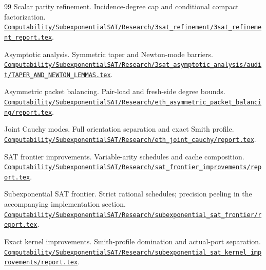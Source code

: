 \begin{thebibliography}{99}
 Scalar parity refinement. Incidence-degree cap and conditional compact factorization.
\href{https://github.com/VladimirReshetnikov/ProveIt/blob/dde01c4a63b822c25b8eb345299346c36f837b49/Computability/SubexponentialSAT/Research/3sat_refinement/3sat_refinement_report.tex}{\nolinkurl{Computability/SubexponentialSAT/Research/3sat_refinement/3sat_refinement_report.tex}}.

 Asymptotic analysis. Symmetric taper and Newton-mode barriers.
\href{https://github.com/VladimirReshetnikov/ProveIt/blob/dde01c4a63b822c25b8eb345299346c36f837b49/Computability/SubexponentialSAT/Research/3sat_asymptotic_analysis/audit/TAPER_AND_NEWTON_LEMMAS.tex}{\nolinkurl{Computability/SubexponentialSAT/Research/3sat_asymptotic_analysis/audit/TAPER_AND_NEWTON_LEMMAS.tex}}.

 Asymmetric packet balancing. Pair-load and fresh-side degree bounds.
\href{https://github.com/VladimirReshetnikov/ProveIt/blob/dde01c4a63b822c25b8eb345299346c36f837b49/Computability/SubexponentialSAT/Research/eth_asymmetric_packet_balancing/report.tex}{\nolinkurl{Computability/SubexponentialSAT/Research/eth_asymmetric_packet_balancing/report.tex}}.

 Joint Cauchy modes. Full orientation separation and exact Smith profile.
\href{https://github.com/VladimirReshetnikov/ProveIt/blob/dde01c4a63b822c25b8eb345299346c36f837b49/Computability/SubexponentialSAT/Research/eth_joint_cauchy/report.tex}{\nolinkurl{Computability/SubexponentialSAT/Research/eth_joint_cauchy/report.tex}}.

 SAT frontier improvements. Variable-arity schedules and cache composition.
\href{https://github.com/VladimirReshetnikov/ProveIt/blob/dde01c4a63b822c25b8eb345299346c36f837b49/Computability/SubexponentialSAT/Research/sat_frontier_improvements/report.tex}{\nolinkurl{Computability/SubexponentialSAT/Research/sat_frontier_improvements/report.tex}}.

 Subexponential SAT frontier. Strict rational schedules; precision peeling in the accompanying implementation section.
\href{https://github.com/VladimirReshetnikov/ProveIt/blob/dde01c4a63b822c25b8eb345299346c36f837b49/Computability/SubexponentialSAT/Research/subexponential_sat_frontier/report.tex}{\nolinkurl{Computability/SubexponentialSAT/Research/subexponential_sat_frontier/report.tex}}.

 Exact kernel improvements. Smith-profile domination and actual-port separation.
\href{https://github.com/VladimirReshetnikov/ProveIt/blob/dde01c4a63b822c25b8eb345299346c36f837b49/Computability/SubexponentialSAT/Research/subexponential_sat_kernel_improvements/report.tex}{\nolinkurl{Computability/SubexponentialSAT/Research/subexponential_sat_kernel_improvements/report.tex}}.


\end{thebibliography}
